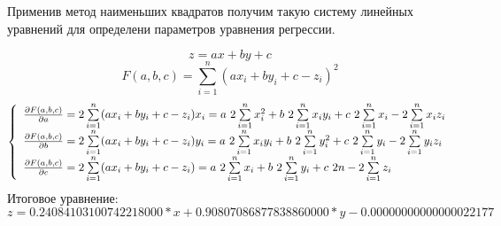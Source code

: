 \documentclass[a4paper,12pt]{article}
\begin{document}
Применив метод наименьших квадратов получим такую систему линейных уравнений для определени параметров уравнения регрессии.

$$z = ax + by + c$$
$$F(a, b, c) = \sum\limits_{i=1}^n (ax_i + by_i + c - z_i)^2$$
$$\left\{
\begin{array}{l l}

\frac{\partial F(a, b, c)}{\partial a} = 2\sum\limits_{i=1}^n (ax_i + by_i + c - z_i)x_i = a\ 2\sum\limits_{i=1}^n x_i^2 + b\ 2\sum\limits_{i=1}^n x_iy_i + c\ 2\sum\limits_{i=1}^n x_i - 2\sum\limits_{i=1}^n x_iz_i\\

\frac{\partial F(a, b, c)}{\partial b} = 2\sum\limits_{i=1}^n (ax_i + by_i + c - z_i)y_i = a\ 2\sum\limits_{i=1}^n x_iy_i + b\ 2\sum\limits_{i=1}^n y_i^2 + c\ 2\sum\limits_{i=1}^n y_i - 2\sum\limits_{i=1}^n y_iz_i\\

\frac{\partial F(a, b, c)}{\partial c} = 2\sum\limits_{i=1}^n (ax_i + by_i + c - z_i) = a\ 2\sum\limits_{i=1}^n x_i + b\ 2\sum\limits_{i=1}^n y_i + c\ 2n - 2\sum\limits_{i=1}^n z_i\\
\end{array}
\right.$$
Итоговое уравнение:
$$z = 0.24084103100742218000*x + 0.90807086877838860000*y-0.00000000000000022177$$
\end{document}
